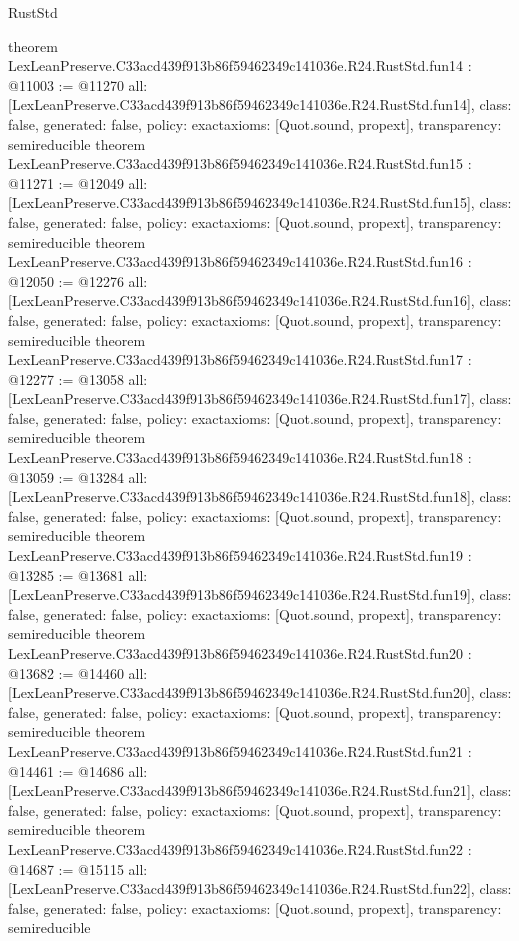 \begin{lexlean}{RustStd}
\begin{coremodule}
{}
theorem LexLeanPreserve.C33acd439f913b86f59462349c141036e.R24.RustStd.fun14 : @11003 := @11270 {
  all: [LexLeanPreserve.C33acd439f913b86f59462349c141036e.R24.RustStd.fun14],
  class: false,
  generated: false,
  policy: exact{axioms: [Quot.sound, propext]},
  transparency: semireducible
}
theorem LexLeanPreserve.C33acd439f913b86f59462349c141036e.R24.RustStd.fun15 : @11271 := @12049 {
  all: [LexLeanPreserve.C33acd439f913b86f59462349c141036e.R24.RustStd.fun15],
  class: false,
  generated: false,
  policy: exact{axioms: [Quot.sound, propext]},
  transparency: semireducible
}
theorem LexLeanPreserve.C33acd439f913b86f59462349c141036e.R24.RustStd.fun16 : @12050 := @12276 {
  all: [LexLeanPreserve.C33acd439f913b86f59462349c141036e.R24.RustStd.fun16],
  class: false,
  generated: false,
  policy: exact{axioms: [Quot.sound, propext]},
  transparency: semireducible
}
theorem LexLeanPreserve.C33acd439f913b86f59462349c141036e.R24.RustStd.fun17 : @12277 := @13058 {
  all: [LexLeanPreserve.C33acd439f913b86f59462349c141036e.R24.RustStd.fun17],
  class: false,
  generated: false,
  policy: exact{axioms: [Quot.sound, propext]},
  transparency: semireducible
}
theorem LexLeanPreserve.C33acd439f913b86f59462349c141036e.R24.RustStd.fun18 : @13059 := @13284 {
  all: [LexLeanPreserve.C33acd439f913b86f59462349c141036e.R24.RustStd.fun18],
  class: false,
  generated: false,
  policy: exact{axioms: [Quot.sound, propext]},
  transparency: semireducible
}
theorem LexLeanPreserve.C33acd439f913b86f59462349c141036e.R24.RustStd.fun19 : @13285 := @13681 {
  all: [LexLeanPreserve.C33acd439f913b86f59462349c141036e.R24.RustStd.fun19],
  class: false,
  generated: false,
  policy: exact{axioms: [Quot.sound, propext]},
  transparency: semireducible
}
theorem LexLeanPreserve.C33acd439f913b86f59462349c141036e.R24.RustStd.fun20 : @13682 := @14460 {
  all: [LexLeanPreserve.C33acd439f913b86f59462349c141036e.R24.RustStd.fun20],
  class: false,
  generated: false,
  policy: exact{axioms: [Quot.sound, propext]},
  transparency: semireducible
}
theorem LexLeanPreserve.C33acd439f913b86f59462349c141036e.R24.RustStd.fun21 : @14461 := @14686 {
  all: [LexLeanPreserve.C33acd439f913b86f59462349c141036e.R24.RustStd.fun21],
  class: false,
  generated: false,
  policy: exact{axioms: [Quot.sound, propext]},
  transparency: semireducible
}
theorem LexLeanPreserve.C33acd439f913b86f59462349c141036e.R24.RustStd.fun22 : @14687 := @15115 {
  all: [LexLeanPreserve.C33acd439f913b86f59462349c141036e.R24.RustStd.fun22],
  class: false,
  generated: false,
  policy: exact{axioms: [Quot.sound, propext]},
  transparency: semireducible
}
\end{coremodule}
\end{lexlean}
